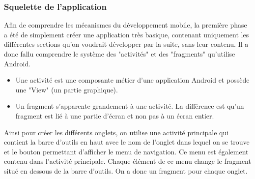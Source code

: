 \subsubsection{Squelette de l'application}
Afin de comprendre les mécanismes du développement mobile, la première phase a été de simplement créer une application très basique, contenant
uniquement les différentes sections qu'on voudrait développer par la suite, sans leur contenu. Il a donc fallu comprendre le système des 
"activités" et des "fragments" qu'utilise Android.
\begin{itemize}
  \item Une activité est une composante métier d'une application Android et possède une "View" (un partie graphique).
  \item Un fragment s'apparente grandement à une activité. La différence est qu'un fragment est lié à une partie d'écran et non pas à un écran entier. 
\end{itemize}
Ainsi pour créer les différents onglets, on utilise une activité principale qui contient la barre d'outils  en haut avec le nom de l'onglet
dans lequel on se trouve et le bouton permettant d'afficher le menu de navigation. Ce menu est également contenu dans l'activité principale.
Chaque élément de ce menu change le fragment situé en dessous de la barre d'outils. On a donc un fragment pour chaque onglet. 
